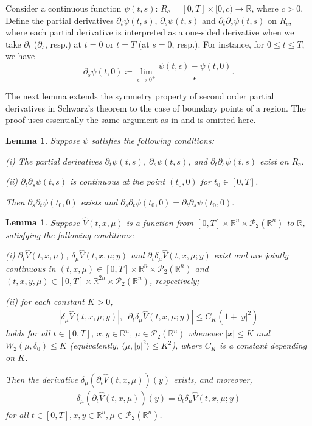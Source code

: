 \documentclass{amsart}
\newtheorem{lemma}[theorem]{Lemma}
\theoremstyle{definition}
\theoremstyle{remark}
\numberwithin{equation}{section}
\begin{document}
Consider a continuous function $\psi(t,s)$: $R_c=[0,T]\times [0, c) \to \mathbb{R}$, where $c>0$. Define the partial derivatives  $\partial_t\psi(t,s)$, $\partial_s\psi(t,s)$ and $\partial_t\partial_s\psi(t,s)$  on $R_c$, where each partial derivative is interpreted as a one-sided derivative when we take $\partial_t$ ($\partial_s $, resp.) at $t=0$ or $t=T$ (at $s=0$, resp.).
For instance,  for $0\le t\le T$, we have
$$\partial_s\psi (t,0)\coloneqq  \lim_{\epsilon\to 0^+} \frac{\psi(t, \epsilon)- \psi(t, 0)}{\epsilon}.
$$



The next lemma extends the symmetry property of second order partial derivatives in Schwarz's theorem \cite{HW08} to the case of  boundary points of a region.
The proof uses essentially the same argument as in \cite[p.317]{HW08} and is omitted here.
\begin{lemma}\label{lemma:sch}
Suppose $\psi$ satisfies the following conditions:

(i) The partial derivatives
$\partial_t\psi(t,s)$, $\partial_s\psi(t,s)$, and $\partial_t\partial_s\psi(t,s)$ exist on $R_c$.

(ii) $\partial_t\partial_s\psi(t,s)$ is continuous at the point $(t_0, 0)$
for $t_0\in [0,T]$.

Then $ \partial_s\partial_t\psi(t_0,0)$ exists and
$\partial_s\partial_t\psi(t_0,0)= \partial_t\partial_s\psi(t_0,0).
$
\end{lemma}





\begin{lemma}\label{lemma:dtdmu}
Suppose $\hat V(t,x,\mu)$ is a function from
$ [0,T]\times \mathbb{R}^n\times {\mathcal P}_2(\mathbb{R}^n)$ to
$\mathbb{R} $, satisfying the following conditions:

(i) $\partial_t\hat V(t,x,\mu)$, $\delta_\mu \hat V(t, x, \mu;y)  $ and $\partial_t \delta_\mu \hat V(t, x, \mu; y)$  exist and are jointly continuous in
$(t, x, \mu) \in [0,T]\times \mathbb{R}^{n} \times {\mathcal P}_2(\mathbb{R}^n)$ and $(t, x, y,\mu) \in [0,T]\times \mathbb{R}^{2n} \times {\mathcal P}_2(\mathbb{R}^n)$, respectively;

(ii) for each constant  $K>0$,
\begin{align*}
| \delta_\mu \hat V(t, x, \mu; y)|,\
|\partial_t \delta_\mu \hat V(t, x, \mu; y)|\le C_K (1+|y|^2)
\end{align*}
holds for all $t\in [0,T]$, $x,y\in \mathbb{R}^n$, $\mu\in {\mathcal P}_2(\mathbb{R}^n)$ whenever $|x|\le K$ and $W_2(\mu,\delta_0)\le K$ (equivalently, $\langle \mu, |y|^2\rangle\le K^2$), where $C_K$ is a constant depending  on $K$.



 Then the derivative  $ \delta_\mu (\partial_t\hat V(t, x, \mu) )(y)$ exists, and moreover,
 \begin{align}\label{Vuttu}
 \delta_\mu (\partial_t\hat V(t, x, \mu) )(y)= \partial_t \delta_\mu \hat V(t, x, \mu; y)
\end{align}
for all
$t\in [0,T],x,y\in \mathbb{R}^n,\mu\in {\mathcal P}_2(\mathbb{R}^n)$.
\end{lemma}
\end{document}
